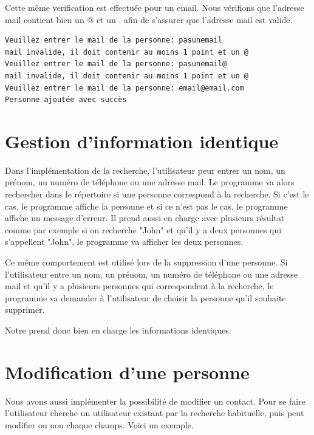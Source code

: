 \documentclass[12pt]{report}
\begin{document}
Cette même verification est effectuée pour un email. Nous vérifions que l'adresse mail contient bien un @ et un . afin de s'assurer que l'adresse mail est valide.

\begin{verbatim}
Veuillez entrer le mail de la personne: pasunemail
mail invalide, il doit contenir au moins 1 point et un @
Veuillez entrer le mail de la personne: pasunemail@
mail invalide, il doit contenir au moins 1 point et un @
Veuillez entrer le mail de la personne: email@email.com
Personne ajoutée avec succès
\end{verbatim}

\section{Gestion d'information identique}
Dans l’implémentation de la recherche, l'utilisateur peur entrer un nom, un prénom, un numéro de téléphone ou une adresse mail. Le programme va alors rechercher dans le répertoire si une personne correspond à la recherche. Si c'est le cas, le programme affiche la personne et si ce n'est pas le cas, le programme affiche un message d'erreur. Il prend aussi en charge avec plusieurs résultat comme par exemple si on recherche "John" et qu'il y a deux personnes qui s'appellent "John", le programme va afficher les deux personnes.

Ce même comportement est utilisé lors de la suppression d'une personne. Si l'utilisateur entre un nom, un prénom, un numéro de téléphone ou une adresse mail et qu'il y a plusieurs personnes qui correspondent à la recherche, le programme va demander à l'utilisateur de choisir la personne qu'il souhaite supprimer.

Notre prend donc bien en charge les informations identiques.

\section{Modification d'une personne}
Nous avons aussi implémenter la possibilité de modifier un contact. Pour se faire l'utilisateur cherche un utilisateur existant par la recherche habituelle, puis peut modifier ou non chaque champs. Voici un exemple.
\end{document}
